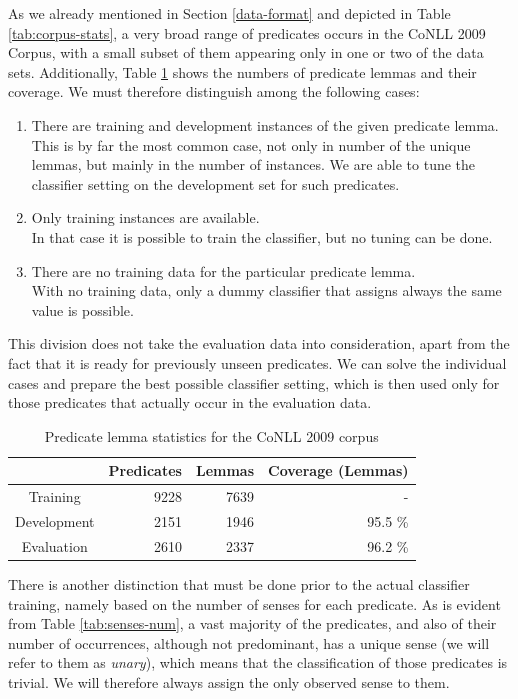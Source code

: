 \documentclass[12pt,notitlepage]{report}
\begin{document}
As we already mentioned in Section \ref{data-format} and depicted in Table \ref{tab:corpus-stats}, a very broad range of predicates occurs in the CoNLL 2009 Corpus, with a small subset of them appearing only in one or two of the data sets. Additionally, Table \ref{tab:lemma-stats} shows the numbers of predicate lemmas and their coverage. We must therefore distinguish among the following cases:
\begin{enumerate}
    \item There are training and development instances of the given predicate lemma. \\
This is by far the most common case, not only in number of the unique lemmas, but mainly in the number of instances. We are able to tune the classifier setting on the development set for such predicates.
    \item Only training instances are available. \\
In that case it is possible to train the classifier, but no tuning can be done. 
    \item There are no training data for the particular predicate lemma. \\
With no training data, only a dummy classifier that assigns always the same value is possible.
\end{enumerate}
This division does not take the evaluation data into consideration, apart from the fact that it is ready for previously unseen predicates. We can solve the individual cases and prepare the best possible classifier setting, which is then used only for those predicates that actually occur in the evaluation data.

\begin{table}[htbp]
\caption{Predicate lemma statistics for the CoNLL 2009 corpus}\label{tab:lemma-stats}
\begin{center}
\begin{tabular}{|c|rrr|}\hline
& \bf Predicates  &\bf Lemmas & \bf Coverage (Lemmas) \\\hline
Training & 9228 & 7639 &  - \\
Development & 2151 & 1946 & 95.5 \% \\
Evaluation &  2610 & 2337 & 96.2 \%  \\\hline
\end{tabular}
\end{center}
\end{table}

There is another distinction that must be done prior to the actual classifier training, namely based on the number of senses for each predicate. As is evident from Table \ref{tab:senses-num}, a vast majority of the predicates, and also of their number of occurrences, although not predominant, has a unique sense (we will refer to them as \emph{unary}), which means that the classification of those predicates is trivial. We will therefore always assign the only observed sense to them.  
\end{document}
